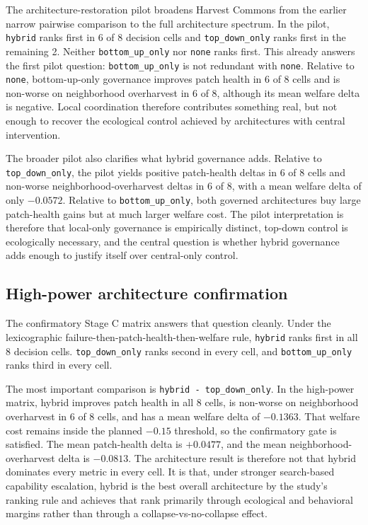 The architecture-restoration pilot broadens Harvest Commons from the earlier narrow pairwise comparison to the full architecture spectrum. In the pilot, \texttt{hybrid} ranks first in 6 of 8 decision cells and \texttt{top\_down\_only} ranks first in the remaining 2. Neither \texttt{bottom\_up\_only} nor \texttt{none} ranks first. This already answers the first pilot question: \texttt{bottom\_up\_only} is not redundant with \texttt{none}. Relative to \texttt{none}, bottom-up-only governance improves patch health in 6 of 8 cells and is non-worse on neighborhood overharvest in 6 of 8, although its mean welfare delta is negative. Local coordination therefore contributes something real, but not enough to recover the ecological control achieved by architectures with central intervention.

The broader pilot also clarifies what hybrid governance adds. Relative to \texttt{top\_down\_only}, the pilot yields positive patch-health deltas in 6 of 8 cells and non-worse neighborhood-overharvest deltas in 6 of 8, with a mean welfare delta of only \(-0.0572\). Relative to \texttt{bottom\_up\_only}, both governed architectures buy large patch-health gains but at much larger welfare cost. The pilot interpretation is therefore that local-only governance is empirically distinct, top-down control is ecologically necessary, and the central question is whether hybrid governance adds enough to justify itself over central-only control.

\subsection{High-power architecture confirmation}

The confirmatory Stage C matrix answers that question cleanly. Under the lexicographic failure-then-patch-health-then-welfare rule, \texttt{hybrid} ranks first in all 8 decision cells. \texttt{top\_down\_only} ranks second in every cell, and \texttt{bottom\_up\_only} ranks third in every cell.

The most important comparison is \texttt{hybrid - top\_down\_only}. In the high-power matrix, hybrid improves patch health in all 8 cells, is non-worse on neighborhood overharvest in 6 of 8 cells, and has a mean welfare delta of \(-0.1363\). That welfare cost remains inside the planned \(-0.15\) threshold, so the confirmatory gate is satisfied. The mean patch-health delta is \(+0.0477\), and the mean neighborhood-overharvest delta is \(-0.0813\). The architecture result is therefore not that hybrid dominates every metric in every cell. It is that, under stronger search-based capability escalation, hybrid is the best overall architecture by the study's ranking rule and achieves that rank primarily through ecological and behavioral margins rather than through a collapse-vs-no-collapse effect.

